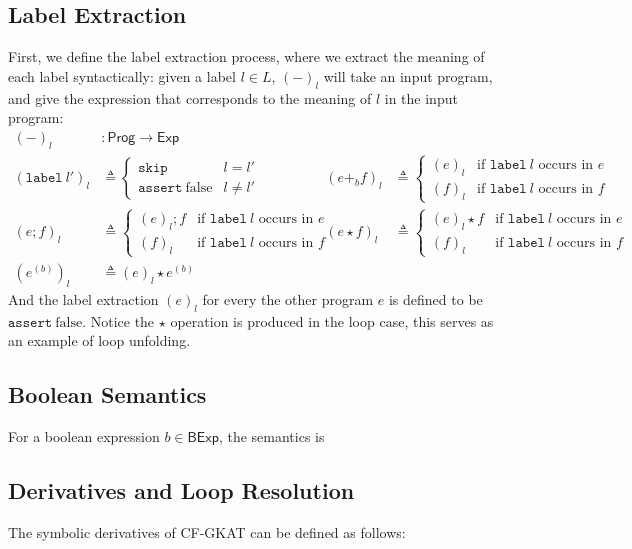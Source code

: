 \documentclass[manuscript,screen,review,anonymous]{acmart}
\newcommand{\false}{\mathrm{false}}
\newcommand{\command}[1]{\texttt{#1}}
\newcommand{\comAssert}[1]{\command{assert}~#1}
\newcommand{\comSkip}{\command{skip}}
\newcommand{\comLabel}[1]{\command{label}~#1}
\newcommand{\theoryOf}[1]{\ensuremath{\mathsf{#1}}}
\newcommand{\Exp}{\theoryOf{Exp}}
\newcommand{\Prog}{\theoryOf{Prog}}
\newcommand{\BExp}{\theoryOf{BExp}}
\begin{document}
\subsection{Label Extraction}

First, we define the label extraction process, where we extract the meaning of each label syntactically: given a label \(l ∈ L\), \((-)_l\) will take an input program, and give the expression that corresponds to the meaning of \(l\) in the input program:
\begin{align*}
  (-)_{l}&: \Prog → \Exp \\  
  (\comLabel{l'})_{l} & ≜ \begin{cases}
    \comSkip & l = l' \\  
    \comAssert{\false} & l ≠ l'
  \end{cases} & 
  (e +_b f)_{l} & ≜ \begin{cases}
    (e)_{l} & \text{if \(\comLabel{l}\) occurs in \(e\)}\\
    (f)_{l} & \text{if \(\comLabel{l}\) occurs in \(f\)}
  \end{cases} \\  
  (e; f)_{l} & ≜ \begin{cases}
    (e)_{l}; f & \text{if \(\comLabel{l}\) occurs in \(e\)}\\
    (f)_{l} & \text{if \(\comLabel{l}\) occurs in \(f\)}
  \end{cases} & 
  (e ⋆ f)_{l} & ≜ \begin{cases}
    (e)_{l} ⋆ f & \text{if \(\comLabel{l}\) occurs in \(e\)}\\
    (f)_{l} & \text{if \(\comLabel{l}\) occurs in \(f\)}
  \end{cases} \\
  (e^{(b)})_{l} & ≜ 
    (e)_l ⋆ e^{(b)}
\end{align*}
And the label extraction \((e)_l\) for every the other program \(e\) is defined to be \(\comAssert{\false}\).
Notice the \(⋆\) operation is produced in the loop case, this serves as an example of loop unfolding.

\subsection{Boolean Semantics}

For a boolean expression \(b ∈ \BExp\), the semantics is 

\subsection{Derivatives and Loop Resolution}

The symbolic derivatives of CF-GKAT can be defined as follows:






\end{document}
